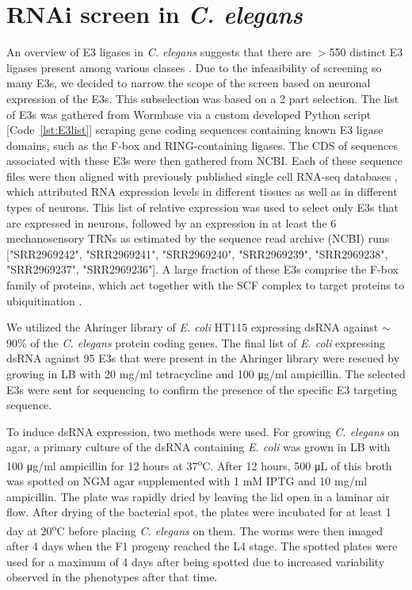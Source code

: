\section{RNAi screen in \textit{C. elegans}}

An overview of E3 ligases in \textit{C. elegans} suggests that there are $>$550 distinct E3 ligases present among various classes \parencite{jin2004, kipreos2000, passmore2004}. Due to the infeasibility of screening so many E3s, we decided to narrow the scope of the screen based on neuronal expression of the E3s. This subselection was based on a 2 part selection. The list of E3s was gathered from Wormbase \parencite{howe2016} via a custom developed Python script [Code~\ref{lst:E3list}] scraping gene coding sequences containing known E3 ligase domains, such as the F-box and RING-containing ligases. The CDS of sequences associated with these E3s were then gathered from NCBI. Each of these sequence files were then aligned with previously published single cell RNA-seq databases \parencite{hutter2016}, which attributed RNA expression levels in different tissues as well as in different types of neurons. This list of relative expression was used to select only E3s that are expressed in neurons, followed by an expression in at least the 6 mechanosensory TRNs as estimated by the sequence read archive (NCBI) runs ["SRR2969242", "SRR2969241", "SRR2969240", "SRR2969239", "SRR2969238", "SRR2969237", "SRR2969236"]. A large fraction of these E3s comprise the F-box family of proteins, which act together with the SCF complex to target proteins to ubiquitination \parencite{kipreos2000}.

We utilized the Ahringer library \parencite{kamath2003} of \textit{E. coli} HT115 expressing dsRNA against $\sim$90\% of the \textit{C. elegans} protein coding genes. The final list of \textit{E. coli} expressing dsRNA against 95 E3s that were present in the Ahringer library were rescued by growing in LB with 20 mg/ml tetracycline and 100 μg/ml ampicillin. The selected E3s were sent for sequencing to confirm the presence of the specific E3 targeting sequence.

To induce dsRNA expression, two methods were used. For growing \textit{C. elegans} on agar, a primary culture of the dsRNA containing \textit{E. coli} was grown in LB with 100 μg/ml ampicillin for 12 hours at 37\textsuperscript{o}C. After 12 hours, 500 μL of this broth was spotted on NGM agar supplemented with 1 mM IPTG and 10 mg/ml ampicillin. The plate was rapidly dried by leaving the lid open in a laminar air flow. After drying of the bacterial spot, the plates were incubated for at least 1 day at 20\textsuperscript{o}C before placing \textit{C. elegans} on them. The worms were then imaged after 4 days when the F1 progeny reached the L4 stage. The spotted plates were used for a maximum of 4 days after being spotted due to increased variability observed in the phenotypes after that time.

